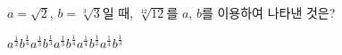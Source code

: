 $a=\sqrt{2}$, $b=\sqrt[3]{3}$일 때, $\sqrt[12]{12}$를 $a$, $b$를 이용하여 나타낸 것은?
\begin{choices32}{$a^{\frac{1}{2}}b^{\frac{1}{4}}$}{$a^{\frac{1}{3}}b^{\frac{1}{3}}$}{$a^{\frac{1}{3}}b^{\frac{1}{4}}$}{$a^{\frac{1}{4}}b^{\frac{1}{2}}$}{$a^{\frac{1}{4}}b^{\frac{1}{3}}$}\end{choices32}
